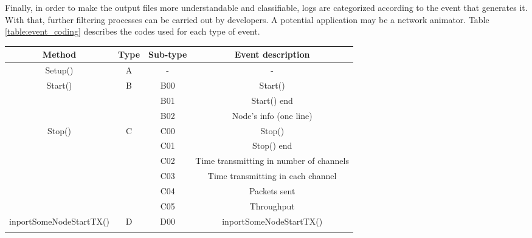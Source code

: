 \documentclass[a4paper]{article}
\begin{document}
Finally, in order to make the output files more understandable and classifiable, logs are categorized according to the event that generates it. With that, further filtering processes can be carried out by developers. A potential application may be a network animator. Table \ref{table:event_coding} describes the codes used for each type of event.		
\begin{table}[h!]
	\centering
	\scriptsize
	\begin{tabular}{|c|c|c|c|}
		\hline
		\textbf{Method}                            & \textbf{Type}       & \textbf{Sub-type} & \textbf{Event description}                              \\ \hline
		Setup()                                    & A                   & -                 & -                                                       \\ \hline
		\multirow{3}{*}{Start()}                   & \multirow{3}{*}{B}  & B00               & Start()                                                 \\ \cline{3-4} 
		&                     & B01               & Start() end                                             \\ \cline{3-4} 
		&                     & B02               & Node's info (one line)                                  \\ \hline
		\multirow{6}{*}{Stop()}                    & \multirow{6}{*}{C}  & C00               & Stop()                                                  \\ \cline{3-4} 
		&                     & C01               & Stop() end                                              \\ \cline{3-4} 
		&                     & C02               & Time transmitting in number of channels                 \\ \cline{3-4} 
		&                     & C03               & Time transmitting in each channel                       \\ \cline{3-4} 
		&                     & C04               & Packets sent                                            \\ \cline{3-4} 
		&                     & C05               & Throughput                                              \\ \hline
		\multirow{14}{*}{inportSomeNodeStartTX()}  & \multirow{14}{*}{D} & D00               & inportSomeNodeStartTX()                                 \\ \cline{3-4} 

\end{tabular}
\end{table}
\end{document}
